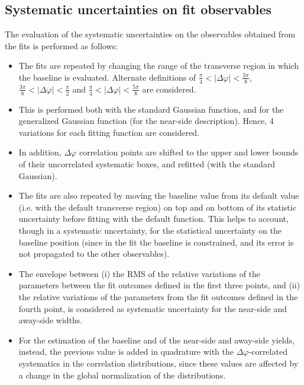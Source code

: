 \clearpage
\subsection{Systematic uncertainties on fit observables}
The evaluation of the systematic uncertainties on the observables obtained from the fits is performed as follows:

\begin{itemize}
\item The fits are repeated by changing the range of the transverse region in which the baseline is evaluated. Alternate definitions of $\frac{\pi}{4}<|\Delta\varphi|<\frac{3\pi}{8}$, $\frac{3\pi}{8}<|\Delta\varphi|<\frac{\pi}{2}$ and $\frac{\pi}{4}<|\Delta\varphi|<\frac{5\pi}{8}$ are considered.
\item This is performed both with the standard Gaussian function, and for the generalized Gaussian function (for the near-side description). Hence, 4 variations for each fitting function are considered.
\item In addition, $\Delta\varphi$ correlation points are shifted to the upper and lower bounds of their uncorrelated systematic boxes, and refitted (with the standard Gaussian).
\item The fits are also repeated by moving the baseline value from its default value (i.e. with the default transverse region) on top and on bottom of its statistic uncertainty before fitting with the default function. This helps to account, though in a systematic uncertainty, for the statistical uncertainty on the baseline position (since in the fit the baseline is constrained, and its error is not propagated to the other observables).
\item The envelope between (i) the RMS of the relative variations of the parameters between the fit outcomes defined in the first three points, and (ii) the relative variations of the parameters from the fit outcomes defined in the fourth point, is considered as systematic uncertainty for the near-side and away-side widths.
\item For the estimation of the baseline and of the near-side and away-side yields, instead, the previous value is added in quadrature with the $\Delta\varphi$-correlated systematics in the correlation distributions, since these values are affected by a change in the global normalization of the distributions.

\end{itemize}
